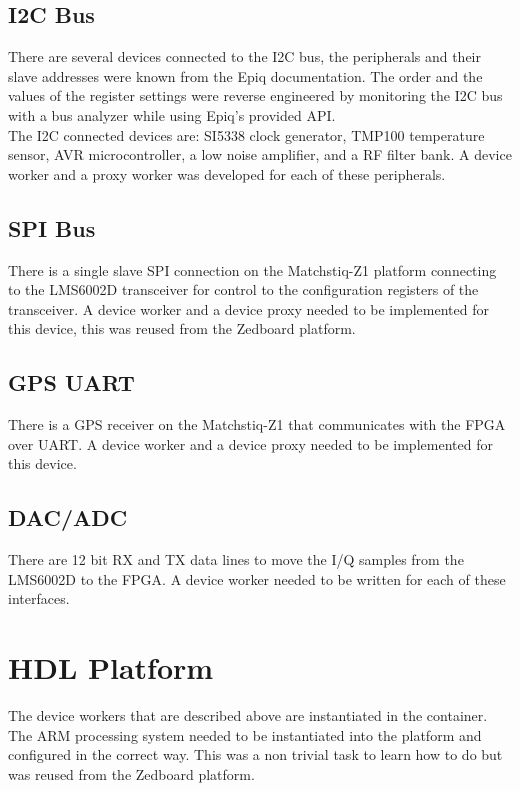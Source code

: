 \documentclass{article}
\begin{document}
  \subsection*{I2C Bus}
    There are several devices connected to the I2C bus, the peripherals and their slave addresses were known from the Epiq documentation.  The order and the values of the register settings were reverse engineered by monitoring the I2C bus with a bus analyzer while using Epiq's provided API.  \\

    The I2C connected devices are: SI5338 clock generator, TMP100 temperature sensor, AVR microcontroller, a low noise amplifier, and a RF filter bank.  A device worker and a  proxy worker was developed for each of these peripherals.

  \subsection*{SPI Bus}
    There is a single slave SPI connection on the Matchstiq-Z1 platform connecting to the LMS6002D transceiver for control to the configuration registers of the transceiver.  A device worker and a device proxy needed to be implemented for this device, this was reused from the Zedboard platform.

  \subsection*{GPS UART}
    There is a GPS receiver on the Matchstiq-Z1 that communicates with the FPGA over UART.  A device worker and a device proxy needed to be implemented for this device.

  \subsection*{DAC/ADC}
    There are 12 bit RX and TX data lines to move the I/Q samples from the LMS6002D to the FPGA.  A device worker needed to be written for each of these interfaces.

\section*{HDL Platform}
  The device workers that are described above are instantiated in the container.  The ARM processing system needed to be instantiated into the platform and configured in the correct way. This was a non trivial task to learn how to do but was reused from the Zedboard platform.
\end{document}
